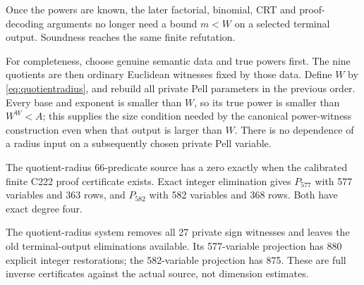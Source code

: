 Once the powers are known, the later factorial, binomial, CRT and proof-decoding arguments no longer need a bound \(m<W\) on a selected terminal output. Soundness reaches the same finite refutation.

For completeness, choose genuine semantic data and true powers first. The nine quotients are then ordinary Euclidean witnesses fixed by those data. Define \(W\) by \eqref{eq:quotientradius}, and rebuild all private Pell parameters in the previous order. Every base and exponent is smaller than \(W\), so its true power is smaller than \(W^W<A\); this supplies the size condition needed by the canonical power-witness construction even when that output is larger than \(W\). There is no dependence of a radius input on a subsequently chosen private Pell variable.

\begin{corollary}\label{cor:quotient}
The quotient-radius 66-predicate source has a zero exactly when the calibrated finite C222 proof certificate exists. Exact integer elimination gives \(P_{577}\) with 577 variables and 363 rows, and \(P_{582}\) with 582 variables and 368 rows. Both have exact degree four.
\end{corollary}

The quotient-radius system removes all 27 private sign witnesses and leaves the old terminal-output eliminations available. Its 577-variable projection has 880 explicit integer restorations; the 582-variable projection has 875. These are full inverse certificates against the actual source, not dimension estimates.
